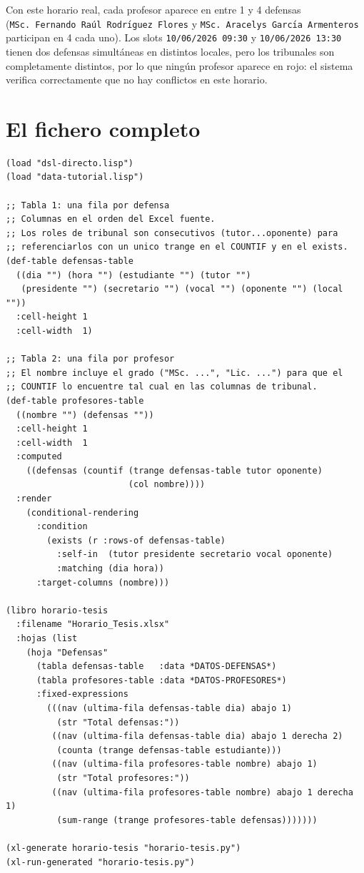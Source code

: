 \documentclass[12pt,a4paper]{report}
\begin{document}
Con este horario real, cada profesor aparece en entre 1 y 4 defensas
(\texttt{MSc.\ Fernando Ra\'ul Rodr\'{\i}guez Flores} y
\texttt{MSc.\ Aracelys Garc\'{\i}a Armenteros} participan en 4 cada uno).
Los slots \texttt{10/06/2026 09:30} y \texttt{10/06/2026 13:30} tienen
dos defensas simult\'aneas en distintos locales, pero los tribunales son
completamente distintos, por lo que ning\'un profesor aparece en rojo:
el sistema verifica correctamente que no hay conflictos en este horario.

\section{El fichero completo}
\label{sec:completo}

\begin{lstlisting}[caption={tutorial-horario.lisp completo.}]
(load "dsl-directo.lisp")
(load "data-tutorial.lisp")

;; Tabla 1: una fila por defensa
;; Columnas en el orden del Excel fuente.
;; Los roles de tribunal son consecutivos (tutor...oponente) para
;; referenciarlos con un unico trange en el COUNTIF y en el exists.
(def-table defensas-table
  ((dia "") (hora "") (estudiante "") (tutor "")
   (presidente "") (secretario "") (vocal "") (oponente "") (local ""))
  :cell-height 1
  :cell-width  1)

;; Tabla 2: una fila por profesor
;; El nombre incluye el grado ("MSc. ...", "Lic. ...") para que el
;; COUNTIF lo encuentre tal cual en las columnas de tribunal.
(def-table profesores-table
  ((nombre "") (defensas ""))
  :cell-height 1
  :cell-width  1
  :computed
    ((defensas (countif (trange defensas-table tutor oponente)
                        (col nombre))))
  :render
    (conditional-rendering
      :condition
        (exists (r :rows-of defensas-table)
          :self-in  (tutor presidente secretario vocal oponente)
          :matching (dia hora))
      :target-columns (nombre)))

(libro horario-tesis
  :filename "Horario_Tesis.xlsx"
  :hojas (list
    (hoja "Defensas"
      (tabla defensas-table   :data *DATOS-DEFENSAS*)
      (tabla profesores-table :data *DATOS-PROFESORES*)
      :fixed-expressions
        (((nav (ultima-fila defensas-table dia) abajo 1)
          (str "Total defensas:"))
         ((nav (ultima-fila defensas-table dia) abajo 1 derecha 2)
          (counta (trange defensas-table estudiante)))
         ((nav (ultima-fila profesores-table nombre) abajo 1)
          (str "Total profesores:"))
         ((nav (ultima-fila profesores-table nombre) abajo 1 derecha 1)
          (sum-range (trange profesores-table defensas)))))))

(xl-generate horario-tesis "horario-tesis.py")
(xl-run-generated "horario-tesis.py")
\end{lstlisting}
\end{document}
